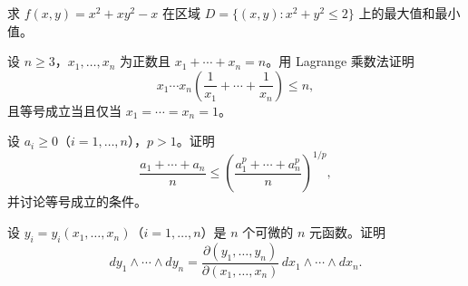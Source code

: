 \noindent\begin{minipage}{\textwidth}
求 $f(x,y)=x^2+xy^2-x$ 在区域 $D=\{(x,y):x^2+y^2\le2\}$ 上的最大值和最小值。
\end{minipage}\par\vfill
\newpage
\noindent\begin{minipage}{\textwidth}
设 $n\ge3$，$x_1,\ldots,x_n$ 为正数且 $x_1+\cdots+x_n=n$。用 Lagrange 乘数法证明\[x_1\cdots x_n\left(\frac1{x_1}+\cdots+\frac1{x_n}\right)\le n,\]且等号成立当且仅当 $x_1=\cdots=x_n=1$。
\end{minipage}\par\vfill
\noindent\begin{minipage}{\textwidth}
设 $a_i\ge0$（$i=1,\ldots,n$），$p>1$。证明\[\frac{a_1+\cdots+a_n}{n}\le\left(\frac{a_1^p+\cdots+a_n^p}{n}\right)^{1/p},\]并讨论等号成立的条件。
\end{minipage}\par\vfill
\noindent\begin{minipage}{\textwidth}
设 $y_i=y_i(x_1,\ldots,x_n)$（$i=1,\ldots,n$）是 $n$ 个可微的 $n$ 元函数。证明\[dy_1\wedge\cdots\wedge dy_n=\frac{\partial(y_1,\ldots,y_n)}{\partial(x_1,\ldots,x_n)}\,dx_1\wedge\cdots\wedge dx_n.\]
\end{minipage}\par\vfill
